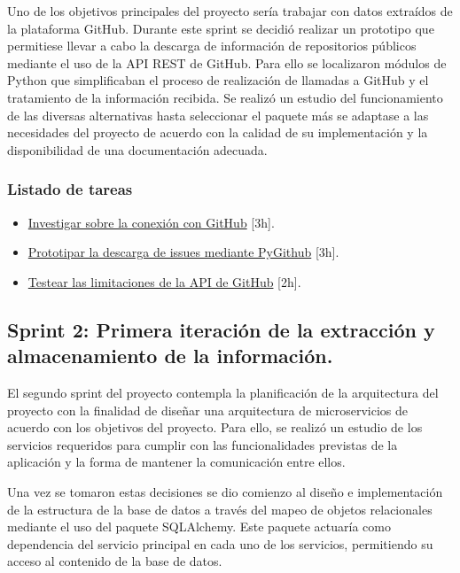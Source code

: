 Uno de los objetivos principales del proyecto sería trabajar con datos extraídos de la plataforma GitHub. Durante este sprint se decidió realizar un prototipo que permitiese llevar a cabo la descarga de información de repositorios públicos mediante el uso de la API REST de GitHub. Para ello se localizaron módulos de Python que simplificaban el proceso de realización de llamadas a GitHub y el tratamiento de la información recibida. Se realizó un estudio del funcionamiento de las diversas alternativas hasta seleccionar el paquete más se adaptase a las necesidades del proyecto de acuerdo con la calidad de su implementación y la disponibilidad de una documentación adecuada.

\subsubsection{Listado de tareas}

\begin{itemize} \setlength\itemsep{0.2em}
    \item \href{https://github.com/MrpYA45/github-text-mining-tfg/issues/1}{Investigar sobre la conexión con GitHub} [3h].
    \item \href{https://github.com/MrpYA45/github-text-mining-tfg/issues/3}{Prototipar la descarga de issues mediante PyGithub} [3h].
    \item \href{https://github.com/MrpYA45/github-text-mining-tfg/issues/4}{Testear las limitaciones de la API de GitHub} [2h].
\end{itemize}

\subsection{Sprint 2: Primera iteración de la extracción y almacenamiento de la información.}

El segundo sprint del proyecto contempla la planificación de la arquitectura del proyecto con la finalidad de diseñar una arquitectura de microservicios de acuerdo con los objetivos del proyecto. Para ello, se realizó un estudio de los servicios requeridos para cumplir con las funcionalidades previstas de la aplicación y la forma de mantener la comunicación entre ellos.

Una vez se tomaron estas decisiones se dio comienzo al diseño e implementación de la estructura de la base de datos a través del mapeo de objetos relacionales mediante el uso del paquete SQLAlchemy. Este paquete actuaría como dependencia del servicio principal en cada uno de los servicios, permitiendo su acceso al contenido de la base de datos.

